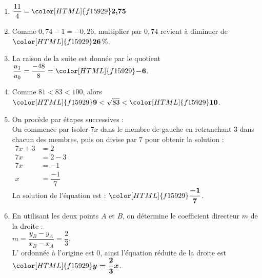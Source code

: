 \documentclass[a4paper,11pt,landscape,exos]{nsi} %
\begin{document}
\begin{multicols}{2}
\begin{enumerate}[itemsep=1em]
    \item $\dfrac{11}{4}={\color[HTML]{f15929}\boldsymbol{2{,}75}}$
    \item Comme $0{,}74-1=-0{,}26$, multiplier par $0{,}74$ revient à diminuer de ${\color[HTML]{f15929}\boldsymbol{26}}\,\%$. 
    \item La raison de la suite est donnée par le quotient $\dfrac{u_1}{u_0}=\dfrac{-48}{8}={\color[HTML]{f15929}\boldsymbol{-6}}$.
    \item Comme $81 < 83 < 100$, alors 
        ${\color[HTML]{f15929}\boldsymbol{9}} < \sqrt{83} < {\color[HTML]{f15929}\boldsymbol{10}}$.
    \item On procède par étapes successives :\\
          On commence par isoler $7x$ dans le membre de gauche en retranchant
          $3$ dans chacun des membres, puis on divise
          par $7$ pour obtenir la solution : \\
           $\begin{aligned}
           7x+3&=2\\
          7x&=2-3\\
          7x&=-1\\
          x&=\dfrac{-1}{7}    
          \end{aligned}$\\
          La solution de l'équation est : ${\color[HTML]{f15929}\boldsymbol{\dfrac{-1}{7}}}$.
          
\vfill\null
\columnbreak
    
    \item En utilisant les deux points $A$ et $B$, on détermine le coefficient directeur $m$ de la droite : \\
        $m=\dfrac{y_B-y_A}{x_B-x_A}=\dfrac{2}{3}$.\\
             L' ordonnée à l'origine est $0$, ainsi l'équation réduite de la droite est ${\color[HTML]{f15929}\boldsymbol{y=\dfrac{2}{3}x}}$.
    

\end{enumerate}
\end{multicols}
\end{document}
